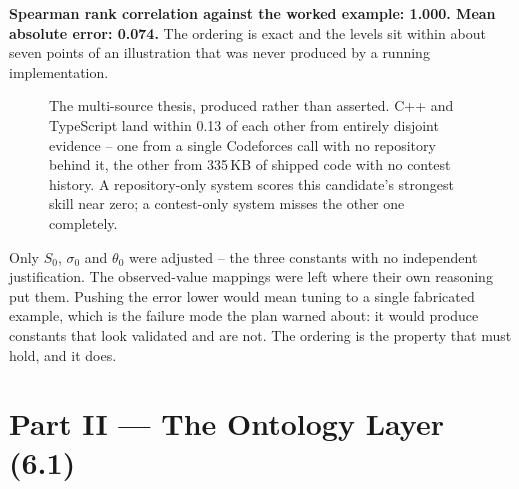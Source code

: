 \documentclass[10pt,a4paper]{article}
\newenvironment{notebox}[1]{%
  \def\FrameCommand{{\color{warn}\vrule width 2.4pt}\hspace{9pt}}%
  \MakeFramed{\advance\hsize-\width \FrameRestore}%
  \noindent{\sffamily\footnotesize\bfseries\color{warn}#1}\par\smallskip
  \small
}{%
  \par\endMakeFramed
}
\begin{document}
\textbf{Spearman rank correlation against the worked example: 1.000. Mean
absolute error: 0.074.} The ordering is exact and the levels sit within
about seven points of an illustration that was never produced by a running
implementation.

\begin{figure}[H]
\centering
{}
\caption{The multi-source thesis, produced rather than asserted. C++ and
TypeScript land within 0.13 of each other from entirely disjoint evidence --
one from a single Codeforces call with no repository behind it, the other
from 335\,KB of shipped code with no contest history. A repository-only
system scores this candidate's strongest skill near zero; a contest-only
system misses the other one completely.}
\end{figure}

\begin{notebox}{Calibration stopped here on purpose}
Only $S_0$, $\sigma_0$ and $\theta_0$ were adjusted -- the three constants
with no independent justification. The observed-value mappings were left
where their own reasoning put them. Pushing the error lower would mean
tuning to a single fabricated example, which is the failure mode the plan
warned about: it would produce constants that look validated and are not.
The ordering is the property that must hold, and it does.
\end{notebox}

\section{Part II --- The Ontology Layer (6.1)}
\end{document}
